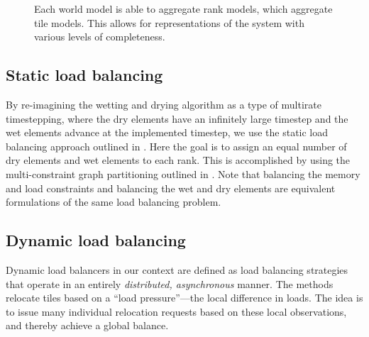\begin{figure}
  \centering
{}
\caption{Each world model is able to aggregate rank models, which aggregate tile models. This allows for representations of the system with various levels of completeness.}
\label{fig:localmodels}
\end{figure}

\subsection{Static load balancing}

By re-imagining the wetting and drying algorithm as a type of multirate timestepping, where the dry elements have an infinitely large timestep and the wet elements advance at the implemented timestep, we use the static load balancing approach outlined in \cite{seny}. Here the goal is to assign an equal number of dry elements and wet elements to each rank. This is accomplished by using the multi-constraint graph partitioning outlined in \cite{KKMC}. Note that balancing the memory and load constraints and balancing the wet and dry elements are equivalent formulations of the same load balancing problem.

\subsection{Dynamic load balancing}
Dynamic load balancers in our context are defined as load balancing strategies that operate in an entirely {\em distributed, asynchronous}  manner.
The methods relocate tiles based on a ``load pressure''---the local difference in loads. The idea is to issue many individual relocation requests based on these local observations, and thereby achieve a global balance.


